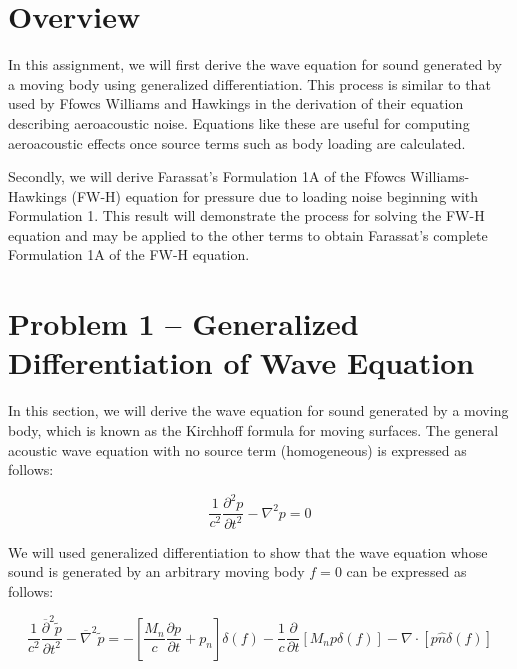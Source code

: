 \documentclass[]{aiaa-tc}%
\begin{document}
\section*{Overview} %

In this assignment, we will first derive the wave equation for sound generated by a moving body using generalized differentiation.  This process is similar to that used by Ffowcs Williams and Hawkings in the derivation of their equation describing aeroacoustic noise.  Equations like these are useful for computing aeroacoustic effects once source terms such as body loading are calculated.

Secondly, we will derive Farassat's Formulation 1A of the Ffowcs Williams-Hawkings (FW-H) equation for pressure due to loading noise beginning with Formulation 1.  This result will demonstrate the process for solving the FW-H equation and may be applied to the other terms to obtain Farassat's complete Formulation 1A of the FW-H equation.




\clearpage

\section{Problem 1 -- Generalized Differentiation of Wave Equation} \label{SecGenDiff}

In this section, we will derive the wave equation for sound generated by a moving body, which is known as the Kirchhoff formula for moving surfaces.  The general acoustic wave equation with no source term (homogeneous) is expressed as follows:

\begin{equation} \label{AcousticWaveHomo}
\boxed{\dfrac{1}{c^2}\dfrac{\partial^2p}{\partial t^2} - \nabla^2p = 0}
\end{equation}

We will used generalized differentiation to show that the wave equation whose sound is generated by an arbitrary moving body $f=0$ can be expressed as follows:

\begin{equation} \label{AcousticWaveBody}
\boxed{\dfrac{1}{c^2}\dfrac{ \overline{\partial}^2\widetilde{p}}{\partial t^2}
    - \overline{\nabla}^2 \widetilde{p}
= -\left[ \dfrac{M_n}{c} \dfrac{\partial p}{\partial t} + p_n \right] \delta(f)
    -\dfrac{1}{c} \dfrac{\partial}{\partial t} \left[ M_n p \delta(f) \right]
    -\nabla \cdot \left[ p \hat{n} \delta(f) \right]}
\end{equation}
\end{document}
